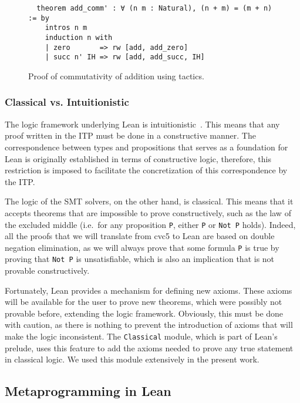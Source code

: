 \begin{figure}[t]
\begin{verbatim}
  theorem add_comm' : ∀ (n m : Natural), (n + m) = (m + n) := by
    intros n m
    induction n with
    | zero       => rw [add, add_zero]
    | succ n' IH => rw [add, add_succ, IH]
\end{verbatim}
 \caption{Proof of commutativity of addition using tactics.}\label{addComm2}
\end{figure}


\subsubsection{Classical vs. Intuitionistic}

The logic framework underlying Lean is intuitionistic~\cite{intuitionistic}. This means that any proof written in the ITP
must be done in a constructive manner. The correspondence between types and propositions that serves as a foundation for Lean
is originally established in terms of constructive logic, therefore, this restriction is imposed to facilitate the concretization
of this correspondence by the ITP.\

The logic of the SMT solvers, on the other hand, is classical. This means that it accepts theorems that are impossible to prove
constructively, such as the law of the excluded middle (i.e.\ for any proposition \texttt{P}, either \texttt{P} or \texttt{Not P}
holds). Indeed, all the proofs that we will translate from cvc5 to Lean are based on double negation elimination, as we will
always prove that some formula \texttt{P} is true by proving that \texttt{Not P} is unsatisfiable, which is also an implication
that is not provable constructively.

Fortunately, Lean provides a mechanism for defining new axioms.
%
These axioms will be available for the user to prove new theorems, which
were possibly not provable before, extending the logic framework.
%
Obviously, this must be done with caution, as there is nothing to
prevent the introduction of axioms that will make the logic inconsistent.
%
The \texttt{Classical} module, which is part of Lean's prelude, uses
this feature to add the axioms needed to prove any true statement in classical logic.
%
We used this module extensively in the present work.

\subsection{Metaprogramming in Lean}\label{sec:metaLean}

